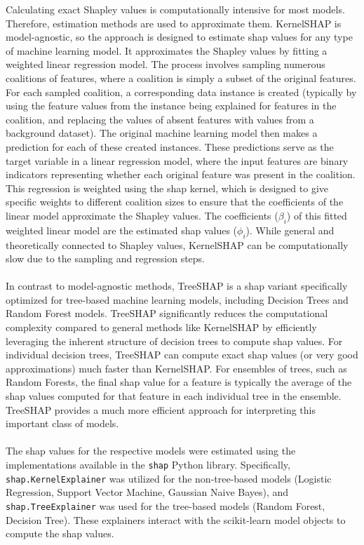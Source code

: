 \documentclass[12pt,a4paper]{report}
\begin{document}
Calculating exact Shapley values is computationally intensive for most models. Therefore, estimation methods are used to approximate them. KernelSHAP \cite{ApprouchForModelPredictions} is model-agnostic, so the approach is designed to estimate \gls{shap} values for any type of machine learning model. It approximates the Shapley values by fitting a weighted linear regression model. The process involves sampling numerous coalitions of features, where a coalition is simply a subset of the original features. For each sampled coalition, a corresponding data instance is created (typically by using the feature values from the instance being explained for features in the coalition, and replacing the values of absent features with values from a background dataset). The original machine learning model then makes a prediction for each of these created instances. These predictions serve as the target variable in a linear regression model, where the input features are binary indicators representing whether each original feature was present in the coalition. This regression is weighted using the \gls{shap} kernel, which is designed to give specific weights to different coalition sizes to ensure that the coefficients of the linear model approximate the Shapley values. The coefficients ($\beta_i$) of this fitted weighted linear model are the estimated \gls{shap} values ($\phi_i$). While general and theoretically connected to Shapley values, KernelSHAP can be computationally slow due to the sampling and regression steps.\\
\\
In contrast to model-agnostic methods, TreeSHAP \cite{Lundberg2019TreeSHAP} is a \gls{shap} variant specifically optimized for tree-based machine learning models, including Decision Trees and Random Forest models. TreeSHAP significantly reduces the computational complexity compared to general methods like KernelSHAP by efficiently leveraging the inherent structure of decision trees to compute \gls{shap} values. For individual decision trees, TreeSHAP can compute exact \gls{shap} values (or very good approximations) much faster than KernelSHAP. For ensembles of trees, such as Random Forests, the final \gls{shap} value for a feature is typically the average of the \gls{shap} values computed for that feature in each individual tree in the ensemble. TreeSHAP provides a much more efficient approach for interpreting this important class of models.\\
\\
The \gls{shap} values for the respective models were estimated using the implementations available in the \texttt{shap} Python library. Specifically, \texttt{shap.KernelExplainer} was utilized for the non-tree-based models (Logistic Regression, Support Vector Machine, Gaussian Naive Bayes), and \texttt{shap.TreeExplainer} was used for the tree-based models (Random Forest, Decision Tree). These explainers interact with the scikit-learn model objects to compute the \gls{shap} values.\\
\end{document}
